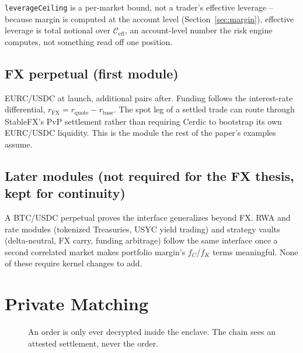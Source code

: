 \documentclass[11pt,a4paper]{article}
\begin{document}
\texttt{leverageCeiling} is a per-market bound, not a trader's effective leverage -- because margin is computed at the account level (Section~\ref{sec:margin}), effective leverage is total notional over $\mathcal{C}_{\text{eff}}$, an account-level number the risk engine computes, not something read off one position.

\subsection{FX perpetual (first module)}

EURC/USDC at launch, additional pairs after. Funding follows the interest-rate differential, $r_{\text{FX}} = r_{\text{quote}} - r_{\text{base}}$. The spot leg of a settled trade can route through StableFX's PvP settlement rather than requiring Cerdic to bootstrap its own EURC/USDC liquidity. This is the module the rest of the paper's examples assume.

\subsection{Later modules (not required for the FX thesis, kept for continuity)}

A BTC/USDC perpetual proves the interface generalizes beyond FX. RWA and rate modules (tokenized Treasuries, USYC yield trading) and strategy vaults (delta-neutral, FX carry, funding arbitrage) follow the same interface once a second correlated market makes portfolio margin's $f_C$/$f_K$ terms meaningful. None of these require kernel changes to add.

\section{Private Matching}
\label{sec:privacy}

\begin{figure}[h]
  \centering
  \caption{An order is only ever decrypted inside the enclave. The chain sees an attested settlement, never the order.}
  \label{fig:tee}
\end{figure}
\end{document}

